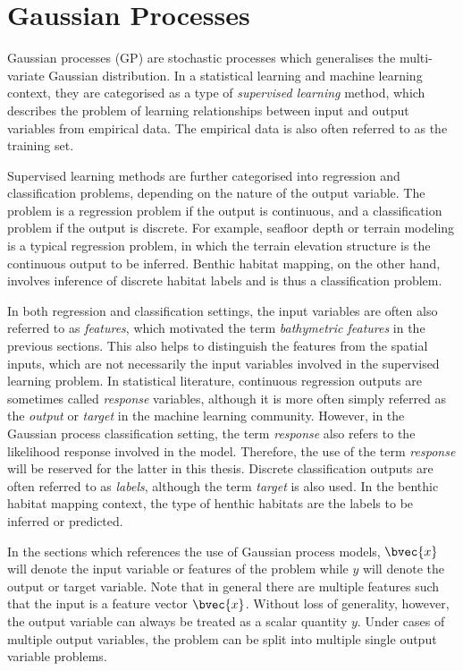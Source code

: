 	\section{Gaussian Processes}
	\label{Background:GaussianProcesses}
	
		Gaussian processes (GP) are stochastic processes which generalises the multi-variate Gaussian distribution. In a statistical learning and machine learning context, they are categorised as a type of \textit{supervised learning} method, which describes the problem of learning relationships between input and output variables from empirical data. The empirical data is also often referred to as the training set.
		
		Supervised learning methods are further categorised into regression and classification problems, depending on the nature of the output variable. The problem is a regression problem if the output is continuous, and a classification problem if the output is discrete. For example, seafloor depth or terrain modeling is a typical regression problem, in which the terrain elevation structure is the continuous output to be inferred. Benthic habitat mapping, on the other hand, involves inference of discrete habitat labels and is thus a classification problem.
		
		In both regression and classification settings, the input variables are often also referred to as \textit{features}, which motivated the term \textit{bathymetric features} in the previous sections. This also helps to distinguish the features from the spatial inputs, which are not necessarily the input variables involved in the supervised learning problem. In statistical literature, continuous regression outputs are sometimes called \textit{response} variables, although it is more often simply referred as the \textit{output} or \textit{target} in the machine learning community. However, in the Gaussian process classification setting, the term \textit{response} also refers to the likelihood response involved in the model. Therefore, the use of the term \textit{response} will be reserved for the latter in this thesis. Discrete classification outputs are often referred to as \textit{labels}, although the term \textit{target} is also used. In the benthic habitat mapping context, the type of henthic habitats are the labels to be inferred or predicted. 
		
		In the sections which references the use of Gaussian process models, $\bvec{x}$ will denote the input variable or features of the problem while $y$ will denote the output or target variable. Note that in general there are multiple features such that the input is a feature vector $\bvec{x}$. Without loss of generality, however, the output variable can always be treated as a scalar quantity $y$. Under cases of multiple output variables, the problem can be split into multiple single output variable problems.
		
